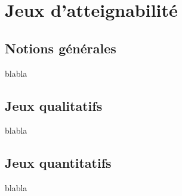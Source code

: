 
\section{Jeux d'atteignabilité}

\subsection{Notions générales}
	blabla
\subsection{Jeux qualitatifs}
	blabla
\subsection{Jeux quantitatifs }
	blabla
